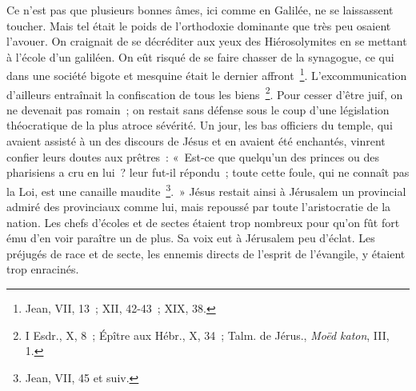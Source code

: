 \documentclass[french,twoside]{book} %
\begin{document}
Ce n’est pas que plusieurs bonnes âmes, ici comme en Galilée, ne se laissassent toucher. Mais tel était le poids de l’orthodoxie dominante que très peu osaient l’avouer. On craignait de se décréditer aux yeux des Hiérosolymites en se mettant à l’école d’un galiléen. On eût risqué de se faire chasser de la synagogue, ce qui dans une société bigote et mesquine était le dernier affront \footnote{Jean, VII, 13 ; XII, 42-43 ; XIX, 38.}. L’excommunication d’ailleurs entraînait la confiscation de tous les biens \footnote{ I Esdr., X, 8 ; Épître aux Hébr., X, 34 ; Talm. de Jérus., {\itshape Moëd katon}, III, 1.}. Pour cesser d’être juif, on ne devenait pas romain ; on restait sans défense sous le coup d’une législation théocratique de la plus atroce sévérité. Un jour, les bas officiers du temple, qui avaient assisté à un des discours de Jésus et en avaient été enchantés, vinrent confier leurs doutes aux prêtres : « Est-ce que quelqu’un des princes ou des pharisiens a cru en lui ? leur fut-il répondu ; toute cette foule, qui ne connaît pas la Loi, est une canaille maudite \footnote{Jean, VII, 45 et suiv.}. » Jésus restait ainsi à Jérusalem un provincial admiré des provinciaux comme lui, mais repoussé par toute l’aristocratie de la nation. Les chefs d’écoles et de sectes étaient trop nombreux pour qu’on fût fort ému d’en voir paraître un de plus. Sa voix eut à Jérusalem peu d’éclat. Les préjugés de race et de secte, les ennemis directs de l’esprit de l’évangile, y étaient trop enracinés.\par
\end{document}

